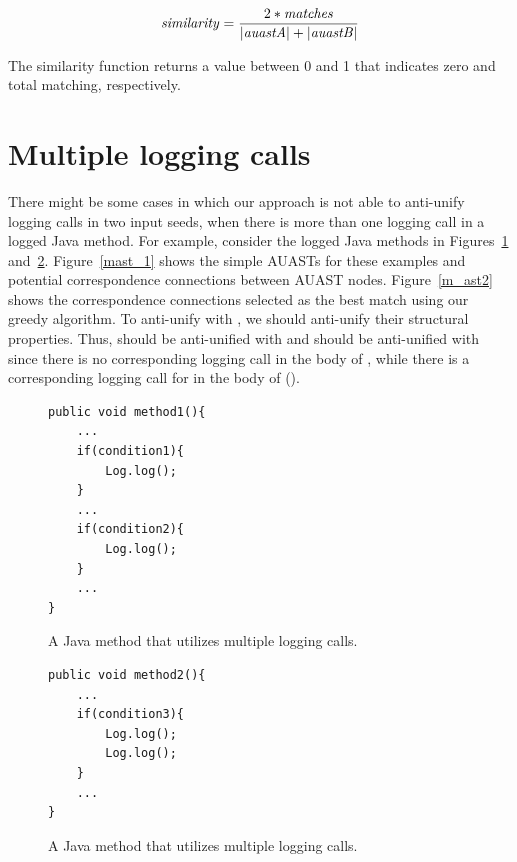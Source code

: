 \begin{equation}\label{eq1}
\mathit{similarity} = \frac{2*\mathit{matches}}{|\mathit{auastA}| + |\mathit{auastB}|}
\end{equation}

The similarity function returns a value between 0 and 1 that indicates zero and total matching, respectively.


\section{Multiple logging calls} \label{meth-multipleLogs}
There might be some cases in which our approach is not able to anti-unify logging calls in two input seeds, when there is more than one logging call in a logged Java method. For example, consider the logged Java methods in Figures~\ref{multiple1} and~\ref{multiple2}. Figure~\ref{mast_1} shows the simple AUASTs for these examples and potential correspondence connections between AUAST nodes. Figure~\ref{m_ast2} shows the correspondence connections selected as the best match using our greedy algorithm. To anti-unify  with , we should anti-unify their structural properties. Thus,  should be anti-unified with  and  should be anti-unified with \nothing{} since there is no corresponding logging call in the body of , while there is a corresponding logging call for  in the body of  ().


\begin{figure}[H]
\def\baselinestretch{1}
\begin{lstlisting}
public void method1(){
	...
	if(condition1){
		Log.log();
	}
	...
	if(condition2){
		Log.log();
	}
	...
}
\end{lstlisting}
\caption{A Java method that utilizes multiple logging calls.\label{multiple1}}
\end{figure}



\begin{figure}[H]
\def\baselinestretch{1}
\begin{lstlisting}
public void method2(){
	...
	if(condition3){
		Log.log();
		Log.log();
	}
	...
}
\end{lstlisting}
\caption{A Java method that utilizes multiple logging calls.\label{multiple2}}
\end{figure}

